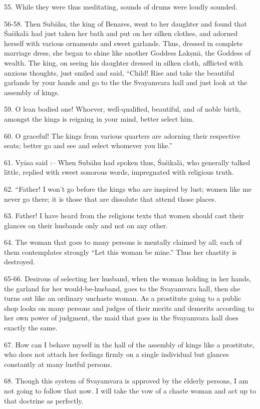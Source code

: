 55. While they were thus meditating, sounds of drums were loudly sounded.

56-58. Then Sub\=ahu, the king of Benares, went to her daughter and found that \'Sa\'sikal\=a had just taken her bath and put on her silken clothes, and adorned herself with various ornaments and sweet garlands. Thus, dressed in complete marriage dress, she began to shine like another Goddess Lak\d{s}m\={\i}, the Goddess of wealth. The king, on seeing his daughter dressed in silken cloth, afflicted with anxious thoughts, just smiled and said, ``Child! Rise and take the beautiful garlands by your hands and go to the the Svayamvara hall and just look at the assembly of kings.

59. O lean bodied one! Whoever, well-qualified, beautiful, and of noble birth, amongst the kings is reigning in your mind, better select him.

60. O graceful! The kings from various quarters are adorning their respective seats; better go and see and select whomever you like.''

61. Vy\=asa said :-- When Sub\=ahu had spoken thus, \'Sa\'sikal\=a, who generally talked little, replied with sweet sonorous words, impregnated with religious truth.

62. ``Father! I won't go before the kings who are inspired by lust; women like me never go there; it is those that are dissolute that attend those places.

63. Father! I have heard from the religious texts that women should cast their glances on their husbands only and not on any other.

64. The woman that goes to many persons is mentally claimed by all; each of them contemplates strongly ``Let this woman be mine.'' Thus her chastity is destroyed.

65-66. Desirous of selecting her husband, when the woman holding in her hands, the garland for her would-be-husband, goes to the Svayamvara hall, then she turns out like an ordinary unchaste woman. As a prostitute going to a public shop looks on many persons and judges of their merits and demerits according to her own power of judgment, the maid that goes in the Svayamvara hall does exactly the same.

67. How can I behave myself in the hall of the assembly of kings like a prostitute, who does not attach her feelings firmly on a single individual but glances constantly at many lustful persons.

68. Though this system of Svayamvara is approved by the elderly persons, I am not going to follow that now. I will take the vow of a chaste woman and act up to that doctrine as perfectly.

